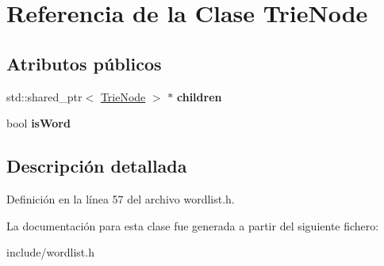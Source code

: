 \hypertarget{classTrieNode}{}\section{Referencia de la Clase Trie\+Node}
\label{classTrieNode}
\subsection*{Atributos públicos}
\begin{DoxyCompactItemize}
\item 
\mbox{\label{classTrieNode_abfaf4116932baeb5904d5f5ea563d67f}} 
std\+::shared\+\_\+ptr$<$ \hyperlink{classTrieNode}{Trie\+Node} $>$ $\ast$ {\bfseries children}
\item 
\mbox{\label{classTrieNode_a675995a5b96c952c10c3c13e22f4baf0}} 
bool {\bfseries is\+Word}
\end{DoxyCompactItemize}


\subsection{Descripción detallada}


Definición en la línea 57 del archivo wordlist.\+h.



La documentación para esta clase fue generada a partir del siguiente fichero\+:\begin{DoxyCompactItemize}
\item 
include/wordlist.\+h\end{DoxyCompactItemize}
